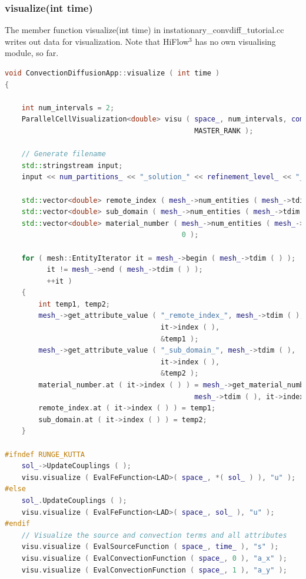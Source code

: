 \documentclass[a4paper, 11pt, twoside]{article}
\begin{document}
\subsubsection{visualize(int time)}\label{sec:visualize}
The member function visualize(int time) in instationary\_convdiff\_tutorial.cc writes out data for visualization. Note that HiFlow$^3$ has no own visualising module, so far.
\begin{lstlisting}[language=C++, basicstyle={\footnotesize, \ttfamily}, keywordstyle=\color{blue}, numbers=none, tabsize=4]
void ConvectionDiffusionApp::visualize ( int time )
{

    int num_intervals = 2;
    ParallelCellVisualization<double> visu ( space_, num_intervals, comm_, 
                                             MASTER_RANK );

    // Generate filename
    std::stringstream input;
    input << num_partitions_ << "_solution_" << refinement_level_ << "_" << time;

    std::vector<double> remote_index ( mesh_->num_entities ( mesh_->tdim ( ) ), 0 );
    std::vector<double> sub_domain ( mesh_->num_entities ( mesh_->tdim ( ) ), 0 );
    std::vector<double> material_number ( mesh_->num_entities ( mesh_->tdim ( ) ), 
                                          0 );

    for ( mesh::EntityIterator it = mesh_->begin ( mesh_->tdim ( ) );
          it != mesh_->end ( mesh_->tdim ( ) );
          ++it )
    {
        int temp1, temp2;
        mesh_->get_attribute_value ( "_remote_index_", mesh_->tdim ( ),
                                     it->index ( ),
                                     &temp1 );
        mesh_->get_attribute_value ( "_sub_domain_", mesh_->tdim ( ),
                                     it->index ( ),
                                     &temp2 );
        material_number.at ( it->index ( ) ) = mesh_->get_material_number ( 
                                             mesh_->tdim ( ), it->index ( ) );
        remote_index.at ( it->index ( ) ) = temp1;
        sub_domain.at ( it->index ( ) ) = temp2;
    }

#ifndef RUNGE_KUTTA
    sol_->UpdateCouplings ( );
    visu.visualize ( EvalFeFunction<LAD>( space_, *( sol_ ) ), "u" );
#else
    sol_.UpdateCouplings ( );
    visu.visualize ( EvalFeFunction<LAD>( space_, sol_ ), "u" );
#endif
    // Visualize the source and convection terms and all attributes
    visu.visualize ( EvalSourceFunction ( space_, time_ ), "s" );
    visu.visualize ( EvalConvectionFunction ( space_, 0 ), "a_x" );
    visu.visualize ( EvalConvectionFunction ( space_, 1 ), "a_y" );


\end{lstlisting}
\end{document}
